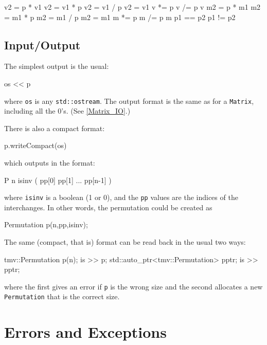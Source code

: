 \documentclass[twoside,letterpaper,11pt]{article}
\renewcommand{\tt}[1]{{\lstinline {#1}}}
\begin{document}
\begin{tmvcode}
v2 = p * v1
v2 = v1 * p
v2 = v1 / p
v2 = v1 %
v *= p
v /= p
v %
m2 = p * m1
m2 = m1 * p
m2 = m1 / p
m2 = m1 %
m *= p
m /= p
m %
p1 == p2
p1 != p2
\end{tmvcode}

\subsection{Input/Output}
\label{Permutation_IO}

The simplest output is the usual:
\begin{tmvcode}
os << p
\end{tmvcode}
where \tt{os} is any \tt{std::ostream}.
The output format is the same as for a \tt{Matrix}, including all the 0's.
(See \ref{Matrix_IO}.)

There is also a compact format:
\begin{tmvcode}
p.writeCompact(os)
\end{tmvcode}
which outputs in the format:
\begin{tmvcode}
P n isinv ( pp[0]  pp[1]  ...  pp[n-1] )
\end{tmvcode}
where \tt{isinv} is a boolean (1 or 0), and the \tt{pp} values are the 
indices of the interchanges.
In other words, the permutation could be created as
\begin{tmvcode}
Permutation p(n,pp,isinv);
\end{tmvcode}

The same (compact, that is) format can be read back in the usual two ways:
\begin{tmvcode}
tmv::Permutation p(n);
is >> p;
std::auto_ptr<tmv::Permutation> pptr;
is >> pptr;
\end{tmvcode}
where the first gives an error if \tt{p} is the wrong size and the second allocates
a new \tt{Permutation} that is the correct size.


\newpage
\section{Errors and Exceptions}
\label{Exceptions}
\end{document}
